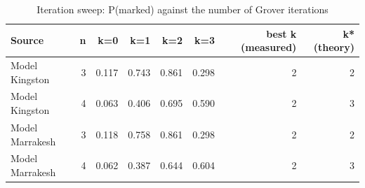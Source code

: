 \begin{table}[t]
\centering
\small
\caption{Iteration sweep: P(marked) against the number of Grover iterations}
\label{tab:sweep}
\begin{tabular}{lrrrrrrr}
\toprule
Source & n & k=0 & k=1 & k=2 & k=3 & best k (measured) & k* (theory) \\
\midrule
Model Kingston & 3 & 0.117 & 0.743 & 0.861 & 0.298 & 2 & 2 \\
Model Kingston & 4 & 0.063 & 0.406 & 0.695 & 0.590 & 2 & 3 \\
Model Marrakesh & 3 & 0.118 & 0.758 & 0.861 & 0.298 & 2 & 2 \\
Model Marrakesh & 4 & 0.062 & 0.387 & 0.644 & 0.604 & 2 & 3 \\
\bottomrule
\end{tabular}
\end{table}
